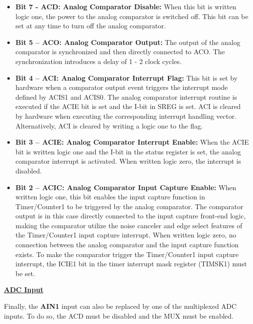 \begin{itemize}
    \item \textbf{Bit 7 - ACD: Analog Comparator Disable:} When this bit is written logic one, the power to the analog comparator is switched off. This bit can be set at any time to turn
    off the analog comparator.

    \item \textbf{Bit 5 – ACO: Analog Comparator Output:} The output of the analog comparator is synchronized and then directly connected to ACO. The synchronization introduces a
    delay of 1 - 2 clock cycles.

    \item \textbf{Bit 4 – ACI: Analog Comparator Interrupt Flag:} This bit is set by hardware when a comparator output event triggers the interrupt mode defined by ACIS1 and ACIS0. The
    analog comparator interrupt routine is executed if the ACIE bit is set and the I-bit in SREG is set. ACI is cleared by hardware when executing the corresponding interrupt handling vector. Alternatively, ACI is cleared by writing a logic one to the flag.

    \item \textbf{Bit 3 – ACIE: Analog Comparator Interrupt Enable:} When the ACIE bit is written logic one and the I-bit in the status register is set, the analog comparator interrupt is activated. When written logic zero, the interrupt is disabled.
    
    \item \textbf{Bit 2 – ACIC: Analog Comparator Input Capture Enable:} When written logic one, this bit enables the input capture function in Timer/Counter1 to be triggered by the analog
    comparator. The comparator output is in this case directly connected to the input capture front-end logic, making the comparator utilize the noise canceler and edge select features of the Timer/Counter1 input capture interrupt. When written logic zero, no connection between the analog comparator and the input capture function exists. To make the comparator trigger the Timer/Counter1 input capture interrupt, the ICIE1 bit in the timer interrupt mask register (TIMSK1) must be set.
    
\end{itemize}

\clearpage

\medskip
\underline{\textbf{ADC Input}}
\medskip


Finally, the \textbf{AIN1} input can also be replaced by one of the multiplexed ADC inputs. To do so, the ACD must be disabled and the MUX must be enabled.\medskip

